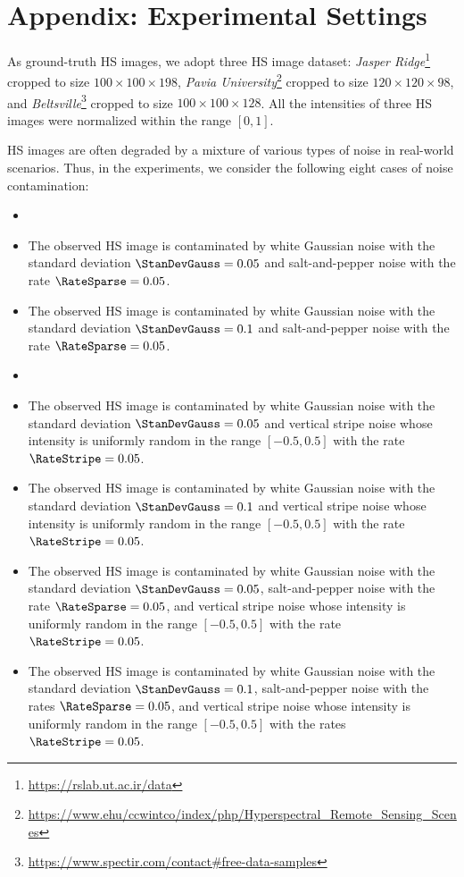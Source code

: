 \section*{Appendix: Experimental Settings}
As ground-truth HS images, we adopt three HS image dataset: \textit{Jasper Ridge}\footnote{\url{https://rslab.ut.ac.ir/data}} cropped to size $100 \times 100 \times 198$, \textit{Pavia University}\footnote{\url{https://www.ehu/ccwintco/index/php/Hyperspectral_Remote_Sensing_Scenes}} cropped to size $120 \times 120 \times 98$, and \textit{Beltsville}\footnote{\url{https://www.spectir.com/contact#free-data-samples}} cropped to size $100 \times 100 \times 128$.
All the intensities of three HS images were normalized within the range $[0, 1]$.

HS images are often degraded by a mixture of various types of noise in real-world scenarios.
Thus, in the experiments, we consider the following eight cases of noise contamination:
\begin{itemize}
	\setlength{\leftskip}{18pt}
	\item [\revise{Case 1:}] 
	\item [Case 2:] The observed HS image is contaminated by white Gaussian noise with the standard deviation $\StanDevGauss = 0.05$ and salt-and-pepper noise with the rate $\RateSparse = 0.05$.
	\item [Case 3:] The observed HS image is contaminated by white Gaussian noise with the standard deviation $\StanDevGauss = 0.1$ and salt-and-pepper noise with the rate $\RateSparse = 0.05$.
	\item [\revise{Case 4:}] 
	\item [Case 5:] The observed HS image is contaminated by white Gaussian noise with the standard deviation $\StanDevGauss = 0.05$ and vertical stripe noise whose intensity is uniformly random in the range $[-0.5, 0.5]$ with the rate $\RateStripe = 0.05$.
	\item [Case 6:] The observed HS image is contaminated by white Gaussian noise with the standard deviation $\StanDevGauss = 0.1$ and vertical stripe noise whose intensity is uniformly random in the range $[-0.5, 0.5]$ with the rate $\RateStripe = 0.05$.
	\item [Case 7:] The observed HS image is contaminated by white Gaussian noise with the standard deviation $\StanDevGauss = 0.05$, salt-and-pepper noise with the rate $\RateSparse = 0.05$, and vertical stripe noise whose intensity is uniformly random in the range $[-0.5, 0.5]$ with the rate $\RateStripe = 0.05$.
	\item [Case 8:] The observed HS image is contaminated by white Gaussian noise with the standard deviation $\StanDevGauss = 0.1$, salt-and-pepper noise with the rates $\RateSparse = 0.05$, and vertical stripe noise whose intensity is uniformly random in the range $[-0.5, 0.5]$ with the rates $\RateStripe = 0.05$.
\end{itemize}

